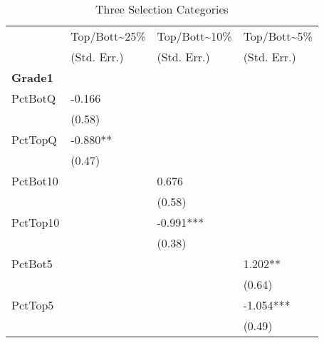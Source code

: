 \clearpage{}

\begin{table}[htb]
  \centering
  \begin{threeparttable}
    \caption{Three Selection Categories}\label{tab:d2}
    \begin{tabular}{l l l l} 
      \hline
      \hline
               & Top/Bott{\textasciitilde}25\% & Top/Bott{\textasciitilde}10\% & Top/Bott{\textasciitilde}5\% \\
               & (Std. Err.)                   & (Std. Err.)                   & (Std. Err.)                  \\
      \hline
      \textbf{Grade1}   &                               &                               &                              \\
      PctBotQ  & -0.166                        &                               &                              \\
               & (0.58)                        &                               &                              \\
      PctTopQ  & -0.880**                      &                               &                              \\
               & (0.47)                        &                               &                              \\
      PctBot10 &                               & 0.676                         &                              \\
               &                               & (0.58)                        &                              \\
      PctTop10 &                               & -0.991***                     &                              \\
               &                               & (0.38)                        &                              \\
      PctBot5  &                               &                               & 1.202**                      \\
               &                               &                               & (0.64)                       \\
      PctTop5  &                               &                               & -1.054***                    \\
               &                               &                               & (0.49)                       \\

\end{tabular}
\end{threeparttable}
\end{table}
